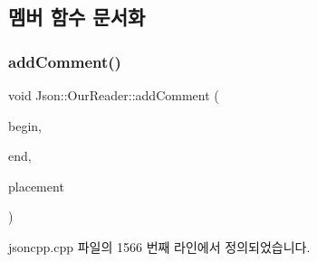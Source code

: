 \subsection{멤버 함수 문서화}
\mbox{\label{class_json_1_1_our_reader_ad7318c37469a9106069a236fb4b10e1f}} 
\subsubsection{\texorpdfstring{add\+Comment()}{addComment()}}
{\footnotesize\ttfamily void Json\+::\+Our\+Reader\+::add\+Comment (\begin{DoxyParamCaption}\item[{\hyperlink{class_json_1_1_our_reader_a1bdc7bbc52ba87cae6b19746f2ee0189}{Location}}]{begin,  }\item[{\hyperlink{class_json_1_1_our_reader_a1bdc7bbc52ba87cae6b19746f2ee0189}{Location}}]{end,  }\item[{\hyperlink{namespace_json_a4fc417c23905b2ae9e2c47d197a45351}{Comment\+Placement}}]{placement }\end{DoxyParamCaption})\hspace{0.3cm}{\ttfamily [private]}}



jsoncpp.\+cpp 파일의 1566 번째 라인에서 정의되었습니다.


